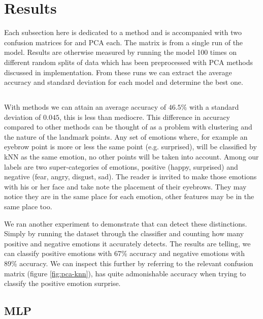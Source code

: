 \section{Results}

Each subsection here is dedicated to a method and is accompanied with two confusion matrices for \tsne and PCA each. The matrix is from a single run of the model. Results are otherwise measured by running the model 100 times on different random splits of data which has been preprocessed with PCA methods discussed in implementation. From these runs we can extract the average accuracy and standard deviation for each model and determine the best one.

\subsection{\knn}


With \knn methods we can attain an average accuracy of $46.5\%$ with a standard deviation of $0.045$, this is less than mediocre. This difference in accuracy compared to other methods can be thought of as a problem with clustering and the nature of the landmark points. Any set of emotions where, for example an eyebrow point is more or less the same point (e.g. surprised), will be classified by kNN as the same emotion, no other points will be taken into account. Among our labels are two super-categories of emotions, positive (happy, surprised) and negative (fear, angry, disgust, sad). The reader is invited to make those emotions with his or her face and take note the placement of their eyebrows. They may notice they are in the same place for each emotion, other features may be in the same place too.

We ran another experiment to demonstrate that \knn can detect these distinctions. Simply by running the dataset through the \knn classifier and counting how many positive and negative emotions it accurately detects. The results are telling, we can classify positive emotions with 67\% accuracy and negative emotions with 89\% accuracy. We can inspect this further by referring to the relevant confusion matrix (figure \ref{fig:pca-knn}), \knn has quite admonishable accuracy when trying to classify the positive emotion surprise.

\subsection{MLP}

